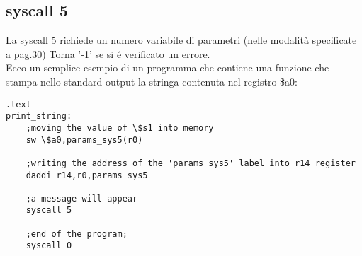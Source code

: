 \documentclass[12pt]{report}
\begin{document}
\subsection{syscall 5}
La syscall 5 richiede un numero variabile di parametri (nelle modalità specificate a pag.30)
Torna '-1' se si \'{e} verificato un errore.\\ 
Ecco un semplice esempio di un programma che contiene una funzione che stampa nello standard output
la stringa contenuta nel registro \$a0:
\begin{lstlisting}[caption={syscall5}, label={code:syscall5}, style={mips}]
      			.text
print_string:
	;moving the value of \$s1 into memory
	sw \$a0,params_sys5(r0)	

	;writing the address of the 'params_sys5' label into r14 register
	daddi r14,r0,params_sys5		

	;a message will appear
	syscall 5				

	;end of the program;
	syscall 0				
\end{lstlisting}
\end{document}

